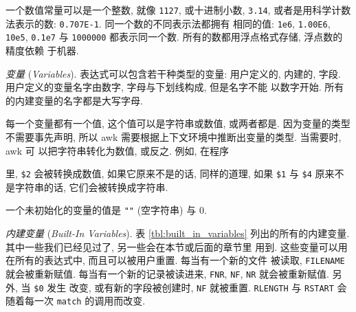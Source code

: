 一个数值常量可以是一个整数, 就像 \verb'1127', 或十进制小数, \verb'3.14',
或者是用科学计数法表示的数: \verb'0.707E-1'. 同一个数的不同表示法都拥有
相同的值: \verb'1e6', \verb'1.00E6', \verb'10e5', \verb'0.1e7' 与
\verb'1000000' 都表示同一个数. 所有的数都用浮点格式存储, 浮点数的精度依赖
于机器.

\emph{变量} (\emph{Variables}). 表达式可以包含若干种类型的变量: 用户定义的,
内建的, 字段. 用户定义的变量名字由数字, 字母与下划线构成, 但是名字不能
以数字开始. 所有的内建变量的名字都是大写字母.

每一个变量都有一个值, 这个值可以是字符串或数值, 或两者都是. 因为变量的类型
不需要事先声明, 所以 awk 需要根据上下文环境中推断出变量的类型.
当需要时, awk 可
以把字符串转化为数值, 或反之. 例如, 在程序
里, \verb'$2' 会被转换成数值, 如果它原来不是的话, 同样的道理, 如果 \verb'$1'
与 \verb'$4' 原来不是字符串的话, 它们会被转换成字符串.

一个未初始化的变量的值是 \verb'""' (空字符串) 与 0.

\emph{内建变量} (\emph{Built-In Variables}). 表 \ref{tbl:built_in_variables}
列出的所有的内建变量. 其中一些我们已经见过了, 另一些会在本节或后面的章节里
用到. 这些变量可以用在所有的表达式中, 而且可以被用户重置. 每当有一个新的文件
被读取, \verb'FILENAME' 就会被重新赋值. 每当有一个新的记录被读进来,
\verb'FNR', \verb'NF', \verb'NR' 就会被重新赋值. 另外, 当 \verb'$0' 发生
改变, 或有新的字段被创建时, \verb'NF' 就被重置. \verb'RLENGTH' 与
\verb'RSTART' 会随着每一次 \verb'match' 的调用而改变.

